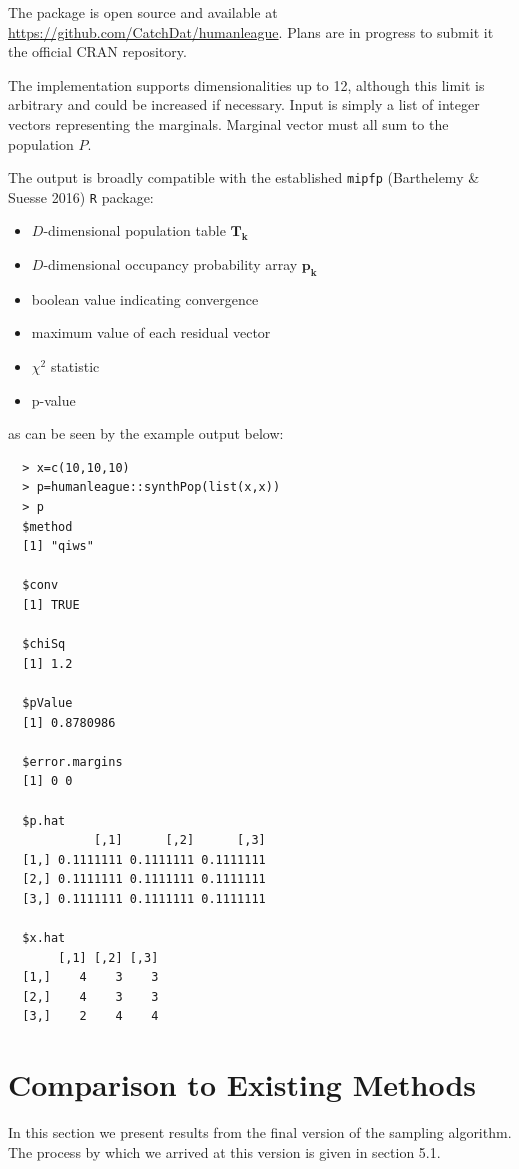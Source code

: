 \documentclass[]{article}
\providecommand{\tightlist}{%
  \setlength{\itemsep}{0pt}\setlength{\parskip}{0pt}}
\begin{document}
The package is open source and available at
\url{https://github.com/CatchDat/humanleague}. Plans are in progress to
submit it the official CRAN repository.

The implementation supports dimensionalities up to 12, although this
limit is arbitrary and could be increased if necessary. Input is simply
a list of integer vectors representing the marginals. Marginal vector
must all sum to the population \(P\).

The output is broadly compatible with the established \texttt{mipfp}
(Barthelemy \& Suesse 2016) \texttt{R} package:

\begin{itemize}
\tightlist
\item
  \(D\)-dimensional population table \(\mathbf{T_\mathbf{k}}\)
\item
  \(D\)-dimensional occupancy probability array
  \(\mathbf{p_\mathbf{k}}\)
\item
  boolean value indicating convergence
\item
  maximum value of each residual vector
\item
  \(\chi^2\) statistic
\item
  p-value
\end{itemize}

as can be seen by the example output below:

\begin{verbatim}
  > x=c(10,10,10)
  > p=humanleague::synthPop(list(x,x))
  > p
  $method
  [1] "qiws"
  
  $conv
  [1] TRUE
  
  $chiSq
  [1] 1.2
  
  $pValue
  [1] 0.8780986
  
  $error.margins
  [1] 0 0
  
  $p.hat
            [,1]      [,2]      [,3]
  [1,] 0.1111111 0.1111111 0.1111111
  [2,] 0.1111111 0.1111111 0.1111111
  [3,] 0.1111111 0.1111111 0.1111111
  
  $x.hat
       [,1] [,2] [,3]
  [1,]    4    3    3
  [2,]    4    3    3
  [3,]    2    4    4
\end{verbatim}

\section{Comparison to Existing
Methods}\label{comparison-to-existing-methods}

In this section we present results from the final version of the
sampling algorithm. The process by which we arrived at this version is
given in section 5.1.
\end{document}
